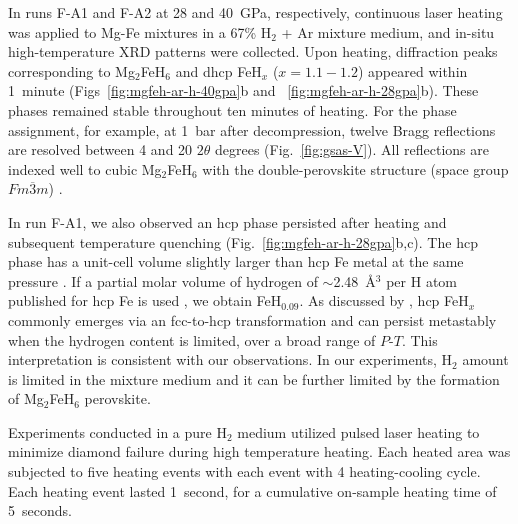 \documentclass[draft,jgrga,12pt]{agujournal2019}
\begin{document}
In runs F-A1 and F-A2 at 28 and 40~{GPa}, respectively, continuous laser heating was applied to Mg-Fe mixtures in a 67\% H$_2$ + Ar mixture medium, and in-situ high-temperature XRD patterns were collected. 
Upon heating, diffraction peaks corresponding to Mg$_2$FeH$_6$ and dhcp FeH$_x$ ($x =1.1{-}1.2$) appeared within 1~minute (Figs~\ref{fig:mgfeh-ar-h-40gpa}b and ~\ref{fig:mgfeh-ar-h-28gpa}b). 
These phases remained stable throughout ten minutes of heating. 
For the phase assignment, for example, at 1~bar after decompression, twelve Bragg reflections are resolved between 4 and 20 $2\theta$ degrees (Fig.~\ref{fig:gsas-V}). 
All reflections are indexed well to cubic Mg$_2$FeH$_6$ with the double-perovskite structure (space group $Fm\overline{3}m$) \cite{didisheim_dimagnesium_1984, retuerto_highpressure_2010}. 

In run F-A1, we also observed an hcp phase persisted after heating and subsequent temperature quenching (Fig.~\ref{fig:mgfeh-ar-h-28gpa}b,c).
The hcp phase has a unit-cell volume slightly larger than hcp Fe metal at the same pressure \cite{dewaele_quasihydrostatic_2006}.
If a partial molar volume of hydrogen of $\sim$2.48~{\AA}$^3$ per H atom published for hcp Fe is used , we obtain FeH$_{0.09}$. 
As discussed by , hcp FeH$_x$ commonly emerges via an fcc-to-hcp transformation and can persist metastably when the hydrogen content is limited, over a broad range of $P$-$T$.
This interpretation is consistent with our observations.
In our experiments, H$_2$ amount is limited in the mixture medium and it can be further limited by the formation of Mg$_2$FeH$_6$ perovskite. 



Experiments conducted in a pure H$_2$ medium utilized pulsed laser heating to minimize diamond failure during high temperature heating.  %
Each heated area was subjected to five heating events with each event with 4 heating-cooling cycle. 
Each heating event lasted 1~second, for a cumulative on-sample heating time of 5~seconds. 
\end{document}
